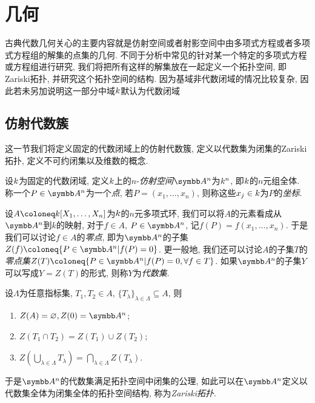 
\section{几何}\label{sec:geometry}

古典代数几何关心的主要内容就是仿射空间或者射影空间中由多项式方程或者多项式方程组的解集的点集的几何. 不同于分析中常见的针对某一个特定的多项式方程或方程组进行研究, 我们将把所有这样的解集放在一起定义一个拓扑空间, 即Zariski拓扑, 并研究这个拓扑空间的结构. 因为基域非代数闭域的情况比较复杂, 因此若未另加说明这一部分中域$k$默认为代数闭域


\subsection{仿射代数簇}\label{sec:varietyaffine}

这一节我们将定义固定的代数闭域上的仿射代数簇, 定义以代数集为闭集的Zariski拓扑, 定义不可约闭集以及维数的概念.

\begin{definition}
  设$k$为固定的代数闭域, 定义$k$上的$n$-\emph{仿射空间}$\AF^n$为$k^n$, 即$k$的$n$元组全体. 称一个$P\in \AF^n$为一个\emph{点}, 若$P=(x_1, \dotsc, x_n)$, 则称这些$x_j\in k$为$P$的\emph{坐标}.
\end{definition}

\begin{definition}
  设$A\coloneq \kk[X_1, \dotsc, X_n]$为$k$的$n$元多项式环, 我们可以将$A$的元素看成从$\AF^n$到$k$的映射, 对于$f\in A$, $P\in \AF^n$, 记$f(P)=f(x_1, \dotsc, x_n)$. 于是我们可以讨论$f\in A$的\emph{零点}, 即为$\AF^n$的子集$Z(f)\coloneq \{P\in \AF^n\vert f(P)=0\}$. 更一般地, 我们还可以讨论$A$的子集$T$的\emph{零点集}$Z(T)\coloneq \{P\in \AF^n\vert f(P)=0, \forall f\in T\}$. 如果$\AF^n$的子集$Y$可以写成$Y=Z(T)$的形式, 则称$Y$为\emph{代数集}.
\end{definition}

\begin{proposition}\label{prop:affinezariskitopology}
  设$\Lambda$为任意指标集, $T_1, T_2\in A$, $\{T_\lambda\}_{\lambda\in\Lambda}\subseteq A$, 则
  \begin{enumerate}
    \item\label{enum:prop-affine-zariski-topology-1} $Z(A)=\varnothing, Z(0)=\AF^n$;
    \item\label{enum:prop-affine-zariski-topology-2} $Z(T_1\cap T_2)=Z(T_1)\cup Z(T_2)$;
    \item\label{enum:prop-affine-zariski-topology-3} $Z(\bigcup_{\lambda\in\Lambda} T_\lambda)=\bigcap_{\lambda\in\Lambda} Z(T_\lambda)$.
  \end{enumerate}
  于是$\AF^n$的代数集满足拓扑空间中闭集的公理, 如此可以在$\AF^n$定义以代数集全体为闭集全体的拓扑空间结构, 称为\emph{Zariski拓扑}.
\end{proposition}

